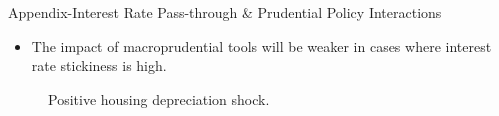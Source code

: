 \documentclass[8pt,aspectratio=169]{beamer}
\numberwithin{equation}{section}
\begin{document}
\begin{frame}{Appendix-Interest Rate Pass-through \& Prudential Policy Interactions}

\begin{itemize}
\item The impact of macroprudential tools will be weaker in cases where interest rate stickiness is high. 
\end{itemize}

\begin{figure}[H]
\caption{Positive housing depreciation shock.  }
\end{figure}


\end{frame}
\end{document}
